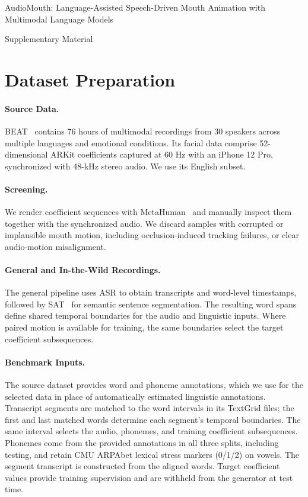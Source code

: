 \begin{center}
{\Large AudioMouth: Language-Assisted Speech-Driven Mouth Animation with Multimodal Language Models

Supplementary Material}
\end{center}

\section{Dataset Preparation}
\label{app:dataset}

\paragraph{Source Data.}
BEAT~\cite{liu2022beat} contains 76 hours of multimodal recordings from 30 speakers across multiple languages and emotional conditions.
Its facial data comprise 52-dimensional ARKit coefficients captured at 60 Hz with an iPhone 12 Pro, synchronized with 48-kHz stereo audio.
We use its English subset.

\paragraph{Screening.}
We render coefficient sequences with MetaHuman~\cite{metahuman} and manually inspect them together with the synchronized audio.
We discard samples with corrupted or implausible mouth motion, including occlusion-induced tracking failures, or clear audio-motion misalignment.

\paragraph{General and In-the-Wild Recordings.}
The general pipeline uses ASR to obtain transcripts and word-level timestamps, followed by SAT~\cite{frohmann2024segment} for semantic sentence segmentation. The resulting word spans define shared temporal boundaries for the audio and linguistic inputs. Where paired motion is available for training, the same boundaries select the target coefficient subsequences.

\paragraph{Benchmark Inputs.}
The source dataset provides word and phoneme annotations, which we use for the selected data in place of automatically estimated linguistic annotations. Transcript segments are matched to the word intervals in its TextGrid files; the first and last matched words determine each segment's temporal boundaries.
The same interval selects the audio, phonemes, and training coefficient subsequences.
Phonemes come from the provided annotations in all three splits, including testing, and retain CMU ARPAbet lexical stress markers (0/1/2) on vowels.
The segment transcript is constructed from the aligned words.
Target coefficient values provide training supervision and are withheld from the generator at test time.

